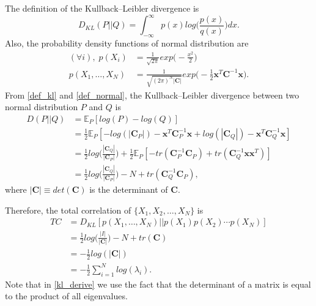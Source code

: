 The definition of the Kullback–Leibler divergence is
\begin{equation}
    D_{KL}(P||Q)=\int_{-\infty}^{\infty}p(x)log\Big(\frac{p(x)}{q(x)}\Big)dx.
    \label{def_kl}
\end{equation}
Also, the probability density functions of normal distribution are
\begin{equation}
    \begin{aligned}
        (\forall i), \;p(X_i) &= \frac{1}{\sqrt{2\pi}}exp\Big(-\frac{x^2}{2}\Big)\\
        p(X_1, \dots, X_N)&=\frac{1}{\sqrt{(2\pi)^N|\mathbf{C}|}}
            exp\Big(-\frac{1}{2}\mathbf{x}^T\mathbf{C}^{-1}\mathbf{x}\Big).
    \end{aligned}
    \label{def_normal}
\end{equation}
From \eqref{def_kl} and \eqref{def_normal}, the Kullback–Leibler divergence between two normal
distribution $P$ and $Q$ is
\begin{equation}
    \begin{aligned}
        D(P||Q)&=\mathbb{E}_P[log(P)-log(Q)]\\
        &=\frac{1}{2}\mathbb{E}_P[-log(|\mathbf{C}_P|)-\mathbf{x}^T\mathbf{C}_P^{-1}\mathbf{x}
        +log(|\mathbf{C}_Q|)-\mathbf{x}^T\mathbf{C}_Q^{-1}\mathbf{x}]\\
        &=\frac{1}{2}log\Big(\frac{|\mathbf{C}_Q|}{|\mathbf{C}_P|}\Big)
        +\frac{1}{2}\mathbb{E}_P[-tr(\mathbf{C}_P^{-1}\mathbf{C}_P)
        +tr(\mathbf{C}_Q^{-1}\mathbf{xx}^T)]\\
        &=\frac{1}{2}log\Big(\frac{|\mathbf{C}_Q|}{|\mathbf{C}_P|}\Big)-N+
        tr(\mathbf{C}_Q^{-1}\mathbf{C}_P),
    \end{aligned}
    \label{kl_normal}
\end{equation}
where $|\mathbf{C}|\equiv det(\mathbf{C})$ is the determinant of $\mathbf{C}$.

Therefore, the total correlation of $\{X_1, X_2, \dots, X_N\}$ is
\begin{equation}
    \begin{aligned}
        TC&=D_{KL}[p(X_1, \dots, X_N)||p(X_1)p(X_2)\cdots p(X_N)]\\
        &=\frac{1}{2}log\Big(\frac{|I|}{|\mathbf{C}|}\Big)-N+
        tr(\mathbf{C})\\
        &=-\frac{1}{2}log(|\mathbf{C}|)\\
        &=-\frac{1}{2}\sum_{i=1}^Nlog(\lambda_i).
    \end{aligned}
    \label{kl_derive}
\end{equation}
Note that in \eqref{kl_derive} we use the fact that the determinant of a matrix is equal to the
product of all eigenvalues.

